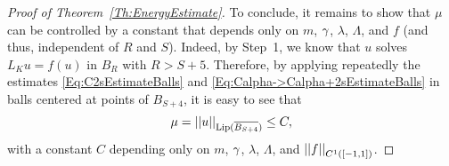 \begin{proof}[Proof of Theorem~\ref{Th:EnergyEstimate}]
To conclude, it remains to show that $\mu$ can be controlled by a constant that depends only on $m$, $\gamma$, $\lambda$, $\Lambda$, and $f$ (and thus, independent of $R$ and $S$). Indeed, by Step~1, we know that $u$ solves $L_K u = f(u)$ in $B_R$ with $R> S+5$. Therefore, by applying repeatedly the estimates \eqref{Eq:C2sEstimateBalls} and \eqref{Eq:Calpha->Calpha+2sEstimateBalls} in balls centered at points of $B_{S+4}$, it is easy to see that
$$
\mu = \left | \left |{u} \right | \right |_{\mathrm{Lip}(\overline{B_{S+4}})} \leq C,
$$ 
with a constant $C$ depending only on $m$, $\gamma$, $\lambda$, $\Lambda$, and $\left | \left |{f} \right | \right |_{C^1([-1,1])}$.
\end{proof}
